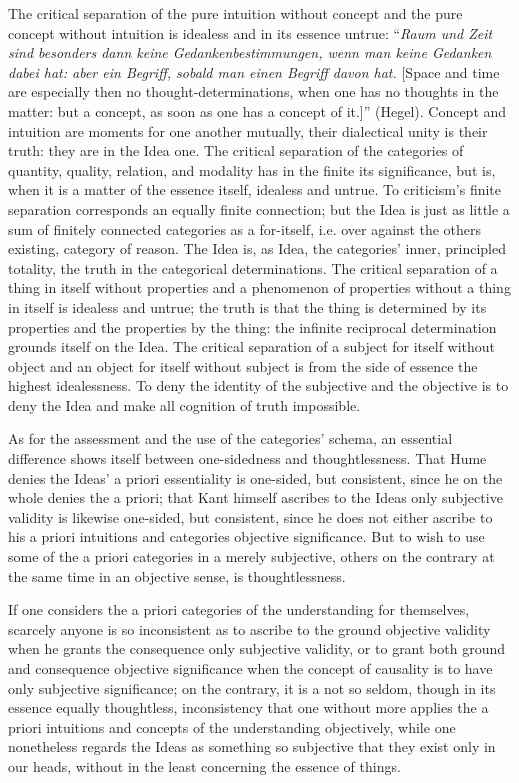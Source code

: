 \documentclass[12pt]{book}
\begin{document}
The critical separation of the pure intuition without concept and the pure concept without intuition is
idealess and in its essence untrue: ``\textit{Raum und Zeit sind besonders dann keine
Gedankenbestimmungen, wenn man keine Gedanken dabei hat: aber ein Begriff, sobald man einen Begriff davon
hat.} [Space and time are especially then no thought-determinations, when one has no thoughts in the
matter: but a concept, as soon as one has a concept of it.]'' (Hegel). Concept and intuition are moments
for one another mutually, their dialectical unity is their truth: they are in the Idea one. The critical
separation of the categories of quantity, quality, relation, and modality has in the finite its
significance, but is, when it is a matter of the essence itself, idealess and untrue. To criticism's
finite separation corresponds an equally finite connection; but the Idea is just as little a sum of
finitely connected categories as a for-itself, i.e. over against the others existing, category of reason.
The Idea is, as Idea, the categories' inner, principled totality, the truth in the categorical
determinations. The critical separation of a thing in itself without properties and a phenomenon of
properties without a thing in itself is idealess and untrue; the truth is that the thing is determined by
its properties and the properties by the thing: the infinite reciprocal determination
grounds itself on the Idea. The critical separation of a subject for itself without object and an object
for itself without subject is from the side of essence the highest idealessness. To deny the identity of
the subjective and the objective is to deny the Idea and make all cognition of truth impossible.

As for the assessment and the use of the categories' schema, an essential difference shows itself between
one-sidedness and thoughtlessness. That Hume denies the Ideas' a priori essentiality is one-sided, but
consistent, since he on the whole denies the a priori; that Kant himself ascribes to the Ideas only
subjective validity is likewise one-sided, but consistent, since he does not either ascribe to his a
priori intuitions and categories objective significance. But to wish to use some of the a priori
categories in a merely subjective, others on the contrary at the same time in an objective sense, is
thoughtlessness.

If one considers the a priori categories of the understanding for themselves, scarcely anyone is so
inconsistent as to ascribe to the ground objective validity when he grants the consequence only
subjective validity, or to grant both ground and consequence objective significance when the concept of
causality is to have only subjective significance; on the contrary, it is a not so seldom, though in its
essence equally thoughtless, inconsistency that one without more applies the a priori intuitions and
concepts of the understanding objectively, while one nonetheless regards the Ideas as something so
subjective that they exist only in our heads, without in the least concerning the essence of things.
\end{document}
